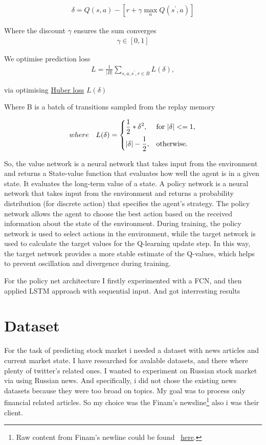 \documentclass{article}
\begin{document}
\begin{align}
\delta = Q(s, a) - [r + \gamma \max_a{Q(s^{'}, a)}] \nonumber
\end{align}

Where the discount $\gamma$  ensures the sum converges
\begin{align}
\gamma \in[0, 1] \nonumber
\end{align}

We optimise prediction loss
\begin{align}
L = \frac{1}{\left|B\right|} \sum_{s,a,s^{'},r\in B}{L(\delta)},
\end{align}

via optimising \href{https://en.wikipedia.org/wiki/Huber_loss}{Huber loss} $L(\delta)$

Where B is a batch of transitions sampled from the replay memory

\begin{align}
where \quad L(\delta) = \begin{dcases*}
    \frac{1}{2}*\delta^2, & for $ |\delta| <= 1 $,\\
    |\delta|-\frac{1}{2}, & otherwise. 
    \end{dcases*} \nonumber 
\end{align}

So, the value network is a neural network that takes input from the environment and returns a State-value function that evaluates how well the agent is in a given state. It evaluates the long-term value of a state.
A policy network is a neural network that takes input from the environment and returns a probability distribution (for discrete action) that specifies the agent's strategy. The policy network allows the agent to choose the best action based on the received information about the state of the environment.
During training, the policy network is used to select actions in the environment, while the target network is used to calculate the target values for the Q-learning update step. In this way, the target network provides a more stable estimate of the Q-values, which helps to prevent oscillation and divergence during training.

For the policy net architecture I firstly experimented with a FCN, and then applied LSTM approach with sequential input. And got interresting results

\section{Dataset}
\label{sec:dataset}
For the task of predicting stock market i needed a dataset with news articles and current market state.
I have researched for avalable datasets, and there where plenty of twitter's related ones.
I wanted to experiment on Russian stock market via using Russian news. 
And specifically, i did not chose the existing news datasets because they were too broad on topics. My goal was to process only financial related articles.
So my choice was the Finam's newsline\footnote{Raw content from Finam's newline could be found ~\href{https://www.finam.ru/publications/selection/united/}{here}.} also i was their client.
\end{document}
